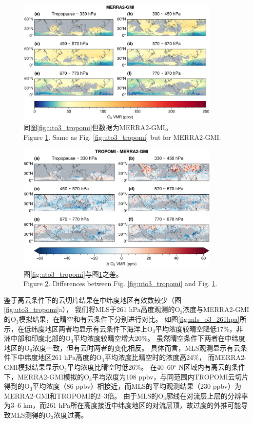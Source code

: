 \begin{figure}[H]
    \centering
    \includegraphics[width=0.9\textwidth]{./figures/uto3_merra2-gmi.png}
    \caption{
    同图\ref{fig:uto3_tropomi}但数据为MERRA2-GMI。 \\
    Figure \ref{fig:uto3_merra2}. Same as Fig. \ref{fig:uto3_tropomi} but for MERRA2-GMI.
    }
    \label{fig:uto3_merra2}
\end{figure}


\begin{figure}[H]
    \centering
    \includegraphics[width=0.9\textwidth]{./figures/uto3_delta.png}
    \caption{
    图\ref{fig:uto3_tropomi}与图\ref{fig:uto3_merra2}之差。 \\
    Figure \ref{fig:uto3_delta}. Differences between Fig. \ref{fig:uto3_tropomi} and Fig. \ref{fig:uto3_merra2}.
    }
    \label{fig:uto3_delta}
\end{figure}


鉴于高云条件下的云切片结果在中纬度地区有效数较少（图\ref{fig:uto3_tropomi}a），
我们将MLS于261 hPa高度观测的O$_3$浓度与MERRA2-GMI的O$_3$模拟结果，在晴空和有云条件下分别进行对比。
如图\ref{fig:mls_o3_261hpa}所示，在低纬度地区两者均显示有云条件下海洋上O$_3$平均浓度较晴空降低17\%，非洲中部和印度北部的O$_3$平均浓度较晴空增大20\%。
虽然晴空条件下两者在中纬度地区的O$_3$浓度一致，但有云时两者的变化相反。
具体而言，MLS观测显示有云条件下中纬度地区261 hPa高度的O$_3$平均浓度比晴空时的浓度高24\%，
而MERRA2-GMI模拟结果显示O$_3$平均浓度比晴空时低26\%。
在40--60$^{\circ}$ N区域内有高云的条件下，MERRA2-GMI模拟的O$_3$平均浓度为108 ppbv，与同范围内TROPOMI云切片得到的O$_3$平均浓度（86 ppbv）相接近，而MLS的平均观测结果（230 ppbv）为MERRA2-GMI和TROPOMI的2--3倍。
由于MLS的O$_3$廓线在对流层上层的分辨率为3--6 km，而261 hPa所在高度接近中纬度地区的对流层顶，故过度的外推可能导致MLS测得的O$_3$浓度过高\citep{Schoeberl.2007}。


